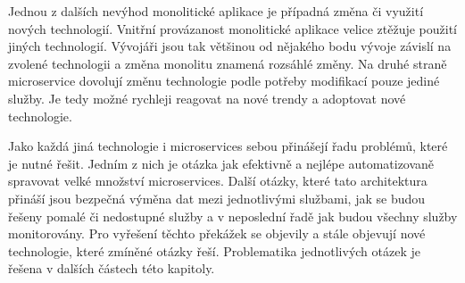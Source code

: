     Jednou z dalších nevýhod monolitické aplikace je případná změna či využití nových technologií. Vnitřní provázanost monolitické aplikace velice ztěžuje použití jiných technologií. Vývojáři jsou tak většinou od nějakého bodu vývoje závislí na zvolené technologii a změna monolitu znamená rozsáhlé změny. Na druhé straně microservice dovolují změnu technologie podle potřeby modifikací pouze jediné služby. Je tedy možné rychleji reagovat na nové trendy a adoptovat nové technologie.\par
    Jako každá jiná technologie i microservices sebou přinášejí řadu problémů, které je nutné řešit. Jedním z nich je otázka jak efektivně a nejlépe automatizovaně spravovat velké množství microservices. Další otázky, které tato architektura přináší jsou bezpečná výměna dat mezi jednotlivými službami, jak se budou řešeny pomalé či nedostupné služby a v neposlední řadě jak budou všechny služby monitorovány. Pro vyřešení těchto překážek se objevily a stále objevují nové technologie, které zmíněné otázky řeší. Problematika jednotlivých otázek je řešena v dalších částech této kapitoly.

